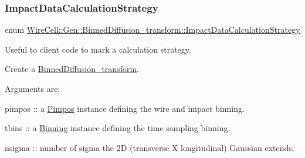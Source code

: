 \subsubsection{\texorpdfstring{Impact\+Data\+Calculation\+Strategy}{ImpactDataCalculationStrategy}}
{\footnotesize\ttfamily enum \hyperlink{class_wire_cell_1_1_gen_1_1_binned_diffusion__transform_af412f1b73b13a90b066cb7284735ddf8}{Wire\+Cell\+::\+Gen\+::\+Binned\+Diffusion\+\_\+transform\+::\+Impact\+Data\+Calculation\+Strategy}}



Useful to client code to mark a calculation strategy. 

Create a \hyperlink{class_wire_cell_1_1_gen_1_1_binned_diffusion__transform}{Binned\+Diffusion\+\_\+transform}.

Arguments are\+:


\begin{DoxyItemize}
\item pimpos \+:\+: a \hyperlink{class_wire_cell_1_1_pimpos}{Pimpos} instance defining the wire and impact binning.
\item tbins \+:\+: a \hyperlink{class_wire_cell_1_1_binning}{Binning} instance defining the time sampling binning.
\end{DoxyItemize}

nsigma \+:\+: number of sigma the 2D (transverse X longitudinal) Gaussian extends.


